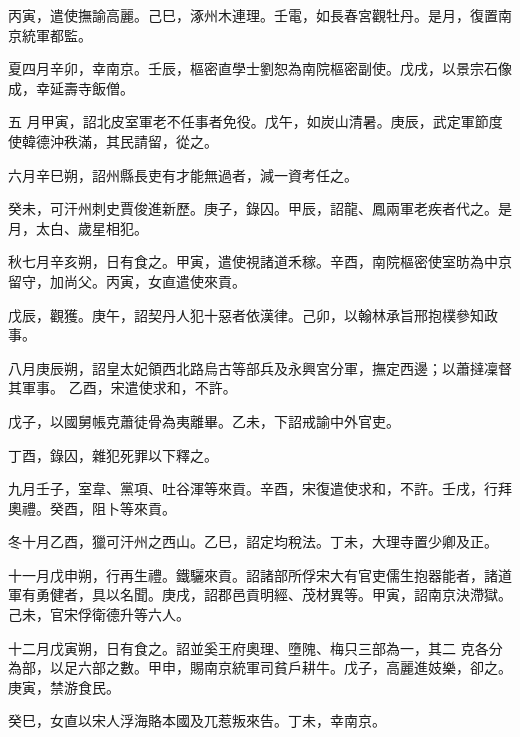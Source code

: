 \begin{pinyinscope}
 丙寅，遣使撫諭高麗。己巳，涿州木連理。壬電，如長春宮觀牡丹。是月，復置南京統軍都監。



 夏四月辛卯，幸南京。壬辰，樞密直學士劉恕為南院樞密副使。戊戌，以景宗石像成，幸延壽寺飯僧。



 五
 月甲寅，詔北皮室軍老不任事者免役。戊午，如炭山清暑。庚辰，武定軍節度使韓德沖秩滿，其民請留，從之。



 六月辛巳朔，詔州縣長吏有才能無過者，減一資考任之。



 癸未，可汗州刺史賈俊進新歷。庚子，錄囚。甲辰，詔龍、鳳兩軍老疾者代之。是月，太白、歲星相犯。



 秋七月辛亥朔，日有食之。甲寅，遣使視諸道禾稼。辛酉，南院樞密使室昉為中京留守，加尚父。丙寅，女直遣使來貢。



 戊辰，觀獲。庚午，詔契丹人犯十惡者依漢律。己卯，以翰林承旨邢抱樸參知政事。



 八月庚辰朔，詔皇太妃領西北路烏古等部兵及永興宮分軍，撫定西邊；以蕭撻凜督其軍事。
 乙酉，宋遣使求和，不許。



 戊子，以國舅帳克蕭徒骨為夷離畢。乙未，下詔戒諭中外官吏。



 丁酉，錄囚，雜犯死罪以下釋之。



 九月壬子，室韋、黨項、吐谷渾等來貢。辛酉，宋復遣使求和，不許。壬戌，行拜奧禮。癸酉，阻卜等來貢。



 冬十月乙酉，獵可汗州之西山。乙巳，詔定均稅法。丁未，大理寺置少卿及正。



 十一月戊申朔，行再生禮。鐵驪來貢。詔諸部所俘宋大有官吏儒生抱器能者，諸道軍有勇健者，具以名聞。庚戌，詔郡邑貢明經、茂材異等。甲寅，詔南京決滯獄。己未，官宋俘衛德升等六人。



 十二月戊寅朔，日有食之。詔並奚王府奧理、墮隗、梅只三部為一，其二
 克各分為部，以足六部之數。甲申，賜南京統軍司貧戶耕牛。戊子，高麗進妓樂，卻之。庚寅，禁游食民。



 癸巳，女直以宋人浮海賂本國及兀惹叛來告。丁未，幸南京。




\end{pinyinscope}
